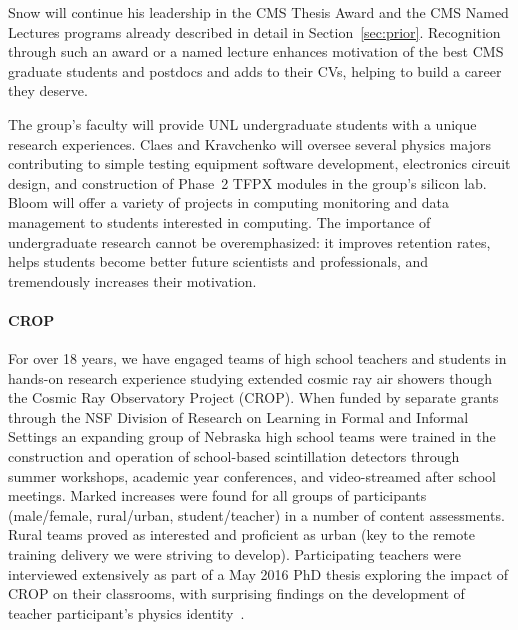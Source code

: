 
\noindent
Snow will continue his leadership in the CMS Thesis Award and the CMS Named Lectures programs already described in detail in Section~\ref{sec:prior}. Recognition through such an award or a named lecture enhances motivation of the best CMS graduate students and postdocs and adds to their CVs, helping to build a career they deserve.

The group's faculty will provide UNL undergraduate students with a unique research experiences. Claes and Kravchenko will oversee several physics majors contributing to simple testing equipment software development, electronics circuit design, and construction of Phase~2 TFPX modules in the group's silicon lab.
Bloom will offer a variety of projects in computing monitoring and data management to students interested in computing.
The importance of undergraduate research cannot be overemphasized: it improves retention rates, helps students become better future 
scientists and professionals, and tremendously increases their motivation.

\paragraph{CROP}
For over 18 years, we have engaged teams of high school teachers and students in hands-on research experience studying extended cosmic ray air showers though the Cosmic Ray Observatory Project (CROP). When funded by separate grants through the NSF Division of Research on Learning in Formal and Informal Settings an expanding group of Nebraska high school teams were trained in the construction and operation of school-based scintillation detectors through summer workshops, academic year conferences, and video-streamed after school meetings. Marked increases were found for all groups of participants (male/female, rural/urban, student/teacher) in a number of content assessments. Rural teams proved as interested and proficient as urban (key to the remote training delivery we were striving to develop). Participating teachers were interviewed extensively as part of a May 2016 PhD thesis exploring the impact of CROP on their classrooms, with surprising findings on the development of teacher participant’s physics identity~\cite{bib:teacherdevelopment}.

